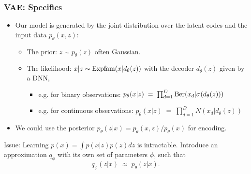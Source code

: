 \documentclass[handout,aspectratio=169]{beamer}
\begin{document}
\begin{frame}
  \frametitle{VAE: Specifics}

  \begin{itemize}
  \item Our model is generated by the joint distribution over the latent codes and the input data  $p_\theta(x, z)$:
  \begin{itemize}
  \item The prior: $z\sim p_\theta(z)$ often Gaussian.
  \item The likelihood:  $x|z \sim {\rm Expfam}(x|d_{\theta}(z))$ with the {decoder}  $d_{\theta}(z)$ given by a DNN,
  \begin{itemize}
  \item e.g. for binary observations:  \;\;\; $p_\theta(x|z)\;=\;\prod_{d=1}^D {\rm Ber}(x_d|\sigma(d_{\theta}(z)))$
  \item e.g. for continuous observations: \;\;\;$p_\theta(x|z)\;=\;\prod_{d=1}^D N(x_d|d_{\theta}(z))$
  \end{itemize}
  \end{itemize} 

\item We could use the posterior $p_\theta(z|x) = p_\theta(x,z)/p_\theta(x)$ for encoding.
\end{itemize}
\pause
\begin{alertblock}{Issue: Learning
    $
    p(x) = \int p(x | z) p(z) dz
    $
    is intractable.}
	Introduce an approximation $q_\phi$ with its own set of parameters $\phi$, such that
    $$
    q_\phi (z|x) \;\approx\; p_\theta(z | x).
    $$

\end{alertblock}
%
\end{frame}
\end{document}
